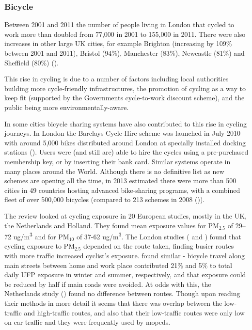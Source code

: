 \subsubsection{Bicycle}
\label{sec:bicycle}

Between 2001 and 2011 the number of people living in London that cycled to work more than doubled from 77,000 in 2001 to 155,000 in 2011. There were also increases in other large UK cities, for example Brighton (increasing by 109\% between 2001 and 2011), Bristol (94\%), Manchester (83\%), Newcastle (81\%) and Sheffield (80\%) (\cite{OfficeforNationalStatistics2014}).

This rise in cycling is due to a number of factors including local authorities building more cycle-friendly infrastructures, the promotion of cycling as a way to keep fit (supported by the Governments cycle-to-work discount scheme), and the public being more environmentally-aware. 

In some cities bicycle sharing systems have also contributed to this rise in cycling journeys. In London the Barclays Cycle Hire scheme was launched in July 2010 with around 5,000 bikes distributed around London at specially installed docking stations (\cite{TransportforLondon2014}). Users were (and still are) able to hire the cycles using a pre-purchased membership key, or by inserting their bank card. Similar systems operate in many places around the World. Although there is no definitive list as new schemes are opening all the time, in 2013 \cite{larsen2013bike} estimated there were more than 500 cities in 49 countries hosting advanced bike-sharing programs, with a combined fleet of over 500,000 bicycles (compared to 213 schemes in 2008 (\cite{Wikipedia2014})).

The \cite{Karanasiou2014} review looked at cycling exposure in 20 European studies, mostly in the UK, the Netherlands and Holland. They found mean exposure values for PM$_{2.5}$ of 29--72 ug/m\textsuperscript{3} and for PM$_{10}$ of 37-62 ug/m\textsuperscript{3}. The London studies (\cite{Kaur2005} and \cite{Adams2001}) found that cycling exposure to PM$_{2.5}$ depended on the route taken, finding busier routes with more traffic increased cyclist's exposure. \cite{Ragettli2013} found similar - bicycle travel along main streets between home and work place contributed 21\% and 5\% to total daily UFP exposure in winter and summer, respectively, and that exposure could be reduced by half if main roads were avoided. At odds with this, the Netherlands study (\cite{Zuurbier2010}) found no difference between routes. Though upon reading their methods in more detail it seems that there was overlap between the low-traffic and high-traffic routes, and also that their low-traffic routes were only low on car traffic and they were frequently used by mopeds.

